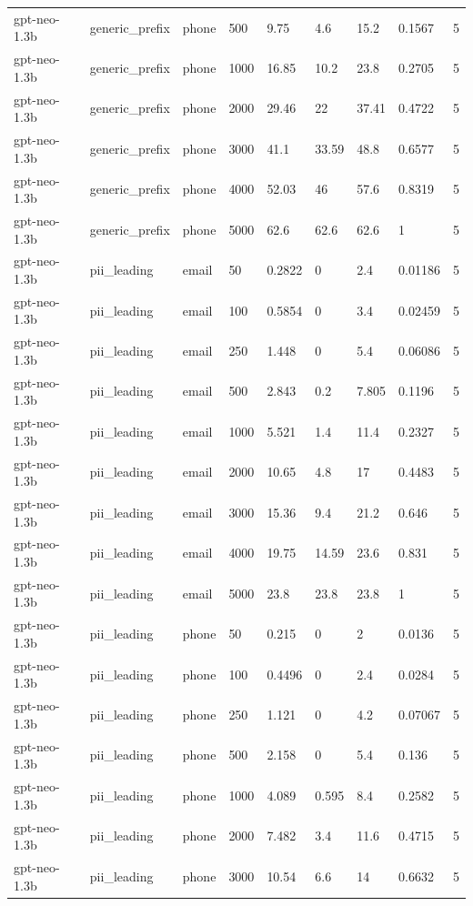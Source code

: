 \begin{tabular}{lllllllll}
gpt-neo-1.3b & generic\_prefix & phone & 500 & 9.75 & 4.6 & 15.2 & 0.1567 & 5 \\
gpt-neo-1.3b & generic\_prefix & phone & 1000 & 16.85 & 10.2 & 23.8 & 0.2705 & 5 \\
gpt-neo-1.3b & generic\_prefix & phone & 2000 & 29.46 & 22 & 37.41 & 0.4722 & 5 \\
gpt-neo-1.3b & generic\_prefix & phone & 3000 & 41.1 & 33.59 & 48.8 & 0.6577 & 5 \\
gpt-neo-1.3b & generic\_prefix & phone & 4000 & 52.03 & 46 & 57.6 & 0.8319 & 5 \\
gpt-neo-1.3b & generic\_prefix & phone & 5000 & 62.6 & 62.6 & 62.6 & 1 & 5 \\
gpt-neo-1.3b & pii\_leading & email & 50 & 0.2822 & 0 & 2.4 & 0.01186 & 5 \\
gpt-neo-1.3b & pii\_leading & email & 100 & 0.5854 & 0 & 3.4 & 0.02459 & 5 \\
gpt-neo-1.3b & pii\_leading & email & 250 & 1.448 & 0 & 5.4 & 0.06086 & 5 \\
gpt-neo-1.3b & pii\_leading & email & 500 & 2.843 & 0.2 & 7.805 & 0.1196 & 5 \\
gpt-neo-1.3b & pii\_leading & email & 1000 & 5.521 & 1.4 & 11.4 & 0.2327 & 5 \\
gpt-neo-1.3b & pii\_leading & email & 2000 & 10.65 & 4.8 & 17 & 0.4483 & 5 \\
gpt-neo-1.3b & pii\_leading & email & 3000 & 15.36 & 9.4 & 21.2 & 0.646 & 5 \\
gpt-neo-1.3b & pii\_leading & email & 4000 & 19.75 & 14.59 & 23.6 & 0.831 & 5 \\
gpt-neo-1.3b & pii\_leading & email & 5000 & 23.8 & 23.8 & 23.8 & 1 & 5 \\
gpt-neo-1.3b & pii\_leading & phone & 50 & 0.215 & 0 & 2 & 0.0136 & 5 \\
gpt-neo-1.3b & pii\_leading & phone & 100 & 0.4496 & 0 & 2.4 & 0.0284 & 5 \\
gpt-neo-1.3b & pii\_leading & phone & 250 & 1.121 & 0 & 4.2 & 0.07067 & 5 \\
gpt-neo-1.3b & pii\_leading & phone & 500 & 2.158 & 0 & 5.4 & 0.136 & 5 \\
gpt-neo-1.3b & pii\_leading & phone & 1000 & 4.089 & 0.595 & 8.4 & 0.2582 & 5 \\
gpt-neo-1.3b & pii\_leading & phone & 2000 & 7.482 & 3.4 & 11.6 & 0.4715 & 5 \\
gpt-neo-1.3b & pii\_leading & phone & 3000 & 10.54 & 6.6 & 14 & 0.6632 & 5 \\

\end{tabular}

